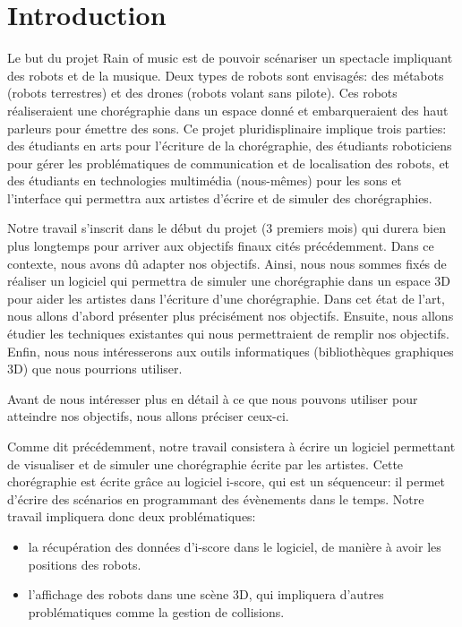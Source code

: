 \section*{Introduction}

Le but du projet Rain of music est de pouvoir scénariser un spectacle impliquant des robots et de la musique. Deux types de robots sont envisagés: des métabots (robots terrestres) et des drones (robots volant sans pilote). Ces robots réaliseraient une chorégraphie dans un espace donné et embarqueraient des haut parleurs pour émettre des sons. Ce projet pluridisplinaire implique trois parties: des étudiants en arts pour l'écriture de la chorégraphie, des étudiants roboticiens pour gérer les problématiques de communication et de localisation des robots, et des étudiants en technologies multimédia (nous-mêmes) pour les sons et l'interface qui permettra aux artistes d'écrire et de simuler des chorégraphies.

Notre travail s'inscrit dans le début du projet (3 premiers mois) qui durera bien plus longtemps pour arriver aux objectifs finaux cités précédemment. Dans ce contexte, nous avons dû adapter nos objectifs. Ainsi, nous nous sommes fixés de réaliser un logiciel qui permettra de simuler une chorégraphie dans un espace 3D pour aider les artistes dans l'écriture d'une chorégraphie. Dans cet état de l'art, nous allons d'abord présenter plus précisément nos objectifs. Ensuite, nous allons étudier les techniques existantes qui nous permettraient de remplir nos objectifs. Enfin, nous nous intéresserons aux outils informatiques (bibliothèques graphiques 3D) que nous pourrions utiliser.

Avant de nous intéresser plus en détail à ce que nous pouvons utiliser pour atteindre nos objectifs, nous allons préciser ceux-ci.

Comme dit précédemment, notre travail consistera à écrire un logiciel permettant de visualiser et de simuler une chorégraphie écrite par les artistes. Cette chorégraphie est écrite grâce au logiciel i-score, qui est un séquenceur: il permet d'écrire des scénarios en programmant des évènements dans le temps. Notre travail impliquera donc deux problématiques: 
\begin{itemize}
\item la récupération des données d'i-score dans le logiciel, de manière à avoir les positions des robots.
\item l'affichage des robots dans une scène 3D, qui impliquera d'autres problématiques comme la gestion de collisions.
\end{itemize} 